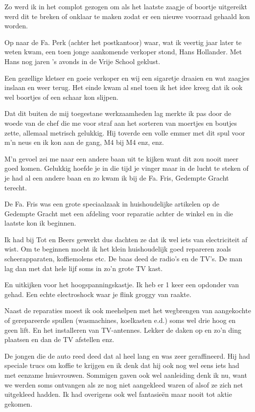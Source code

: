 \documentclass[10pt,twoside,openright]{memoir}
\begin{document}
Zo werd ik in het complot gezogen om als het laatste zaagje of boortje uitgereikt werd dit te breken of onklaar te maken zodat er een nieuwe voorraad gehaald kon worden. 

Op naar de Fa. Perk (achter het postkantoor) waar, wat ik veertig jaar later te weten kwam, een toen jonge aankomende verkoper stond, Hans Hollander. Met Hans nog jaren ’s avonds in de Vrije School geklust. 

Een gezellige kletser en goeie verkoper en wij een sigaretje draaien en wat zaagjes inslaan en weer terug. Het einde kwam al snel toen ik het idee kreeg dat ik ook wel boortjes of een schaar kon slijpen. 

Dat dit buiten de mij toegestane werkzaamheden lag merkte ik pas door de woede van de chef die me voor straf aan het sorteren van moertjes en boutjes zette, allemaal metrisch gelukkig. Hij toverde een volle emmer met dit spul voor m’n neus en ik kon aan de gang, M4 bij M4 enz, enz. 

M’n gevoel zei me naar een andere baan uit te kijken want dit zou nooit meer goed komen. Gelukkig hoefde je in die tijd je vinger maar in de lucht te steken of je had al een andere baan en zo kwam ik bij de Fa. Fris, Gedempte Gracht terecht.

De Fa. Fris was een grote speciaalzaak in huishoudelijke artikelen op de Gedempte Gracht met een afdeling voor reparatie achter de winkel en in die laatste kon ik beginnen. 

Ik had bij Tot en Beers gewerkt dus dachten ze dat ik wel iets van electriciteit af wist. Om te beginnen mocht ik het klein huishoudelijk goed repareren zoals scheerapparaten, koffiemolens etc. De baas deed de radio’s en de TV’s. De man lag dan met dat hele lijf soms in zo’n grote TV kast. 

En uitkijken voor het hoogspanningskastje. Ik heb er 1 keer een opdonder van gehad. Een echte electroshock waar je flink groggy van raakte.

Naast de reparaties moest ik ook meehelpen met het wegbrengen van aangekochte of gerepareerde spullen (wasmachines, koelkasten e.d.) soms wel drie hoog en geen lift. En het installeren van TV-antennes. Lekker de daken op en zo’n ding plaatsen en dan de TV afstellen enz. 

De jongen die de auto reed deed dat al heel lang en was zeer geraffineerd. Hij had speciale trucs om koffie te krijgen en ik denk dat hij ook nog wel eens iets had met eenzame huisvrouwen. Sommigen gaven ook wel aanleiding denk ik nu, want we werden soms ontvangen als ze nog niet aangekleed waren of alsof ze zich net uitgekleed hadden. Ik had overigens ook wel fantasieën maar nooit tot aktie gekomen. 
\end{document}
